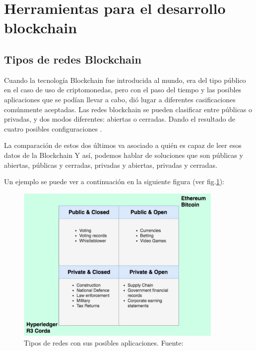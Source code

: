 \section{Herramientas para el desarrollo blockchain}

\subsection{Tipos de redes Blockchain}

Cuando la tecnología Blockchain fue introducida al mundo, era del tipo público en el caso de uso de criptomonedas, pero
con el paso del tiempo y las posibles aplicaciones que se podían llevar a cabo, dió lugar a diferentes casificaciones 
comúnmente aceptadas. Las redes blockchain se pueden clasificar entre públicas o privadas, y dos modos diferentes: 
abiertas o cerradas. Dando el resultado de cuatro posibles configuraciones \cite{public-private-blockchain}.

\vspace{5mm}

\noindent La comparación de estos dos últimos va asociado a quién es capaz de leer esos datos de la Blockchain Y así, 
podemos hablar de soluciones que son públicas y abiertas, públicas y cerradas, privadas y abiertas, privadas y 
cerradas.

\vspace{5mm}

\noindent Un ejemplo se puede ver a continuación en la siguiente figura (ver fig.\ref{fig:tipos-de-redes}):

\vspace{5mm}

\begin{figure}[ht!]
    \centering
    \includegraphics[width=10cm]{imagenes/herramientas/tipos_de_redes}
    \caption{Tipos de redes con sus posibles aplicaciones. Fuente: \cite{public-private-blockchain}}
    \label{fig:tipos-de-redes}
\end{figure}

